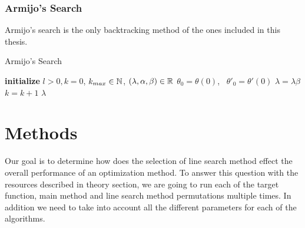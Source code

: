 \documentclass[a4paper,english,titlepage,12pt]{article}
\newcommand{\R}{\ensuremath\mathbb{R}}
\newcommand{\N}{\ensuremath\mathbb{N}}
\begin{document}
\subsubsection{Armijo's Search}

Armijo's search is the only backtracking method of the ones included in this thesis. 

\begin{algorithm}[H]
\caption{Armijo's Search}
\label{alg_armijo}
\begin{algorithmic}[1]
\STATE \textbf{initialize} $l > 0, k = 0$, $k_{max} \in \N$, $(\lambda, \alpha, \beta) \in \R$
\STATE $\theta_0 = \theta(0)$, \ $\theta'_0 = \theta'(0)$
    \STATE $\lambda = \lambda \beta$
    \STATE $k = k + 1$
\ENDWHILE
\RETURN $\lambda$
\end{algorithmic}
\end{algorithm}



\section{Methods}


Our goal is to determine how does the selection of line search method effect the overall performance of an optimization method. To answer this question with the resources described in theory section, we are going to run each of the target function, main method and line search method permutations multiple times. In addition we need to take into account all the different parameters for each of the algorithms.
\end{document}
